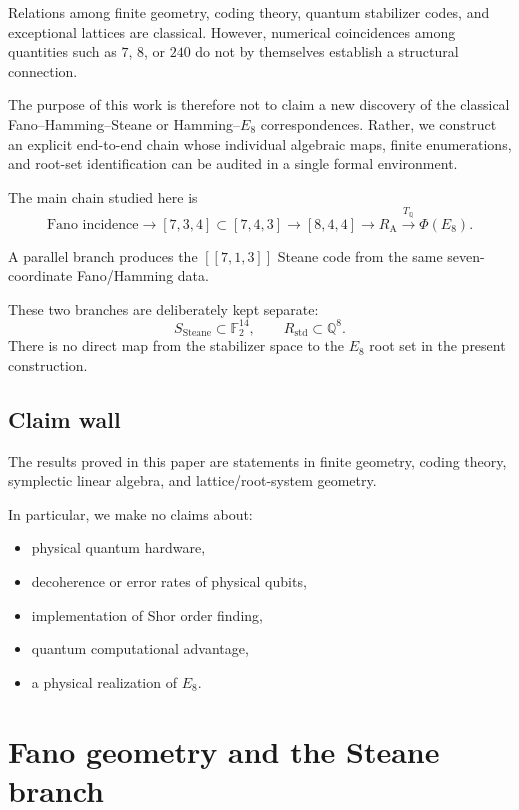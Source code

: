 \documentclass[11pt,a4paper]{article}
\theoremstyle{definition}
\theoremstyle{remark}
\newcommand{\F}{\mathbb F}
\newcommand{\Q}{\mathbb Q}
\newcommand{\RA}{R_{\mathrm A}}
\newcommand{\Rstd}{R_{\mathrm{std}}}
\newcommand{\TQ}{T_{\mathbb Q}}
\begin{document}
Relations among finite geometry, coding theory, quantum stabilizer codes, and
exceptional lattices are classical.  However, numerical coincidences among
quantities such as $7$, $8$, or $240$ do not by themselves establish a
structural connection.

The purpose of this work is therefore not to claim a new discovery of the
classical Fano--Hamming--Steane or Hamming--$E_8$ correspondences.  Rather,
we construct an explicit end-to-end chain whose individual algebraic maps,
finite enumerations, and root-set identification can be audited in a single
formal environment.

The main chain studied here is
\[
\text{Fano incidence}
\longrightarrow
[7,3,4]\subset[7,4,3]
\longrightarrow
[8,4,4]
\longrightarrow
\RA
\overset{\TQ}{\longrightarrow}
\Phi(E_8).
\]

A parallel branch produces the $[[7,1,3]]$ Steane code from the same
seven-coordinate Fano/Hamming data.

These two branches are deliberately kept separate:
\[
S_{\mathrm{Steane}}\subset\F_2^{14},
\qquad
\Rstd\subset\Q^8.
\]
There is no direct map from the stabilizer space to the $E_8$ root set in
the present construction.

\subsection*{Claim wall}

The results proved in this paper are statements in finite geometry, coding
theory, symplectic linear algebra, and lattice/root-system geometry.

In particular, we make no claims about:
\begin{itemize}[nosep]
    \item physical quantum hardware,
    \item decoherence or error rates of physical qubits,
    \item implementation of Shor order finding,
    \item quantum computational advantage,
    \item a physical realization of $E_8$.
\end{itemize}

\section{Fano geometry and the Steane branch}
\end{document}
